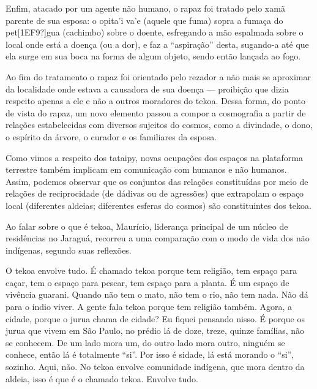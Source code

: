 \documentclass{article}
\begin{document}
Enfim, atacado por um agente n\~ao humano, o rapaz foi tratado pelo
xam\~a parente de sua esposa: o opita{\textquoteright}i
va{\textquoteright}e (aquele que fuma) sopra a fuma\c{c}a do
pet[1EF9?]gua (cachimbo) sobre o doente, esfregando a m\~ao espalmada
sobre o local onde est\'a a doen\c{c}a (ou a dor), e faz a
{\textquotedblleft}aspira\c{c}\~ao{\textquotedblright} desta, sugando-a
at\'e que ela surge em sua boca na forma de algum objeto, sendo ent\~ao
lan\c{c}ada ao fogo. 

Ao fim do tratamento o rapaz foi orientado pelo rezador a n\~ao mais se
aproximar da localidade onde estava a causadora de sua doen\c{c}a ---
proibi\c{c}\~ao que dizia respeito apenas a ele e n\~ao a outros
moradores do tekoa. Dessa forma, do ponto de vista do rapaz, um novo
elemento passou a compor a cosmografia a partir de rela\c{c}\~oes
estabelecidas com diversos sujeitos do cosmos, como a divindade, o
dono, o esp\'irito da \'arvore, o curador e os familiares da esposa.

Como vimos a respeito dos tataipy, novas ocupa\c{c}\~oes dos espa\c{c}os
na plataforma terrestre tamb\'em implicam em comunica\c{c}\~ao com
humanos e n\~ao humanos. Assim, podemos observar que os conjuntos das
rela\c{c}\~oes constitu\'idas por meio de rela\c{c}\~oes de
reciprocidade (de d\'adivas ou de agress\~oes) que extrapolam o
espa\c{c}o local (diferentes aldeias; diferentes esferas do cosmos)
s\~ao constituintes dos tekoa.

Ao falar sobre o que \'e tekoa, Maur\'icio, lideran\c{c}a principal de
um n\'ucleo de resid\^encias no Jaragu\'a, recorreu a uma
compara\c{c}\~ao com o modo de vida dos n\~ao ind\'igenas, segundo suas
reflex\~oes.

O tekoa envolve tudo. \'E chamado tekoa porque tem religi\~ao, tem
espa\c{c}o para ca\c{c}ar, tem o espa\c{c}o para pescar, tem espa\c{c}o
para a planta. \'E um espa\c{c}o de viv\^encia guarani. Quando n\~ao
tem o mato, n\~ao tem o rio, n\~ao tem nada. N\~ao d\'a para o \'indio
viver. A gente fala tekoa porque tem religi\~ao tamb\'em. Agora, a
cidade, porque o jurua chama de cidade? Eu fiquei pensando nisso. \'E
porque os jurua que vivem em S\~ao Paulo, no pr\'edio l\'a de doze,
treze, quinze fam\'ilias, n\~ao se conhecem. De um lado mora um, do
outro lado mora outro, ningu\'em se conhece, ent\~ao l\'a \'e
totalmente {\textquotedblleft}si{\textquotedblright}. Por isso \'e
sidade, l\'a est\'a morando o
{\textquotedblleft}si{\textquotedblright}, sozinho. Aqui, n\~ao. No
tekoa envolve comunidade ind\'igena, que mora dentro da aldeia, isso
\'e que \'e o chamado tekoa. Envolve tudo.
\end{document}
